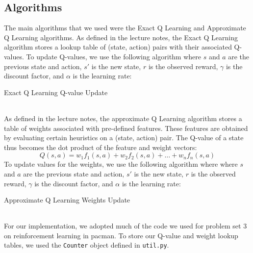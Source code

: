 \documentclass[11pt]{article}
\begin{document}
\subsection{Algorithms}
The main algorithms that we used were the Exact Q Learning and Approximate Q Learning algorithms. As defined in the lecture notes, the Exact Q Learning algorithm stores a lookup table of (state, action) pairs with their associated Q-values. To update Q-values, we use the following algorithm where $s$ and $a$ are the previous state and action, $s'$ is the new state, $r$ is the observed reward, $\gamma$ is the discount factor, and $\alpha$ is the learning rate:
\begin{algorithm}
  \begin{algorithmic}
    \EndProcedure{}
  \end{algorithmic}
  \caption{Exact Q Learning Q-value Update}
\end{algorithm}\\
As defined in the lecture notes, the approximate Q Learning algorithm stores a table of weights associated with pre-defined features. These features are obtained by evaluating certain heuristics on a (state, action) pair. The Q-value of a state thus becomes the dot product of the feature and weight vectors:
$$Q(s,a) = w_1f_1(s,a) + w_2f_2(s,a) + \ldots + w_nf_n(s,a)$$
To update values for the weights, we use the following algorithm where where $s$ and $a$ are the previous state and action, $s'$ is the new state, $r$ is the observed reward, $\gamma$ is the discount factor, and $\alpha$ is the learning rate:
\begin{algorithm}
  \begin{algorithmic}
        \EndFor{}
    \EndProcedure{}
  \end{algorithmic}
  \caption{Approximate Q Learning Weights Update}
\end{algorithm}\\
For our implementation, we adopted much of the code we used for problem set 3 on reinforcement learning in pacman. To store our Q-value and weight lookup tables, we used the \texttt{Counter} object defined in \texttt{util.py}.
\end{document}
